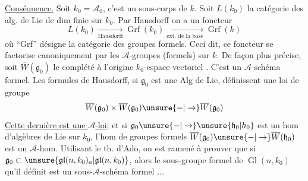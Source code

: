 \uline{Conséquence.} Soit $k_0=\mathcal A_0$, c'est un sous-corps de $k$. Soit $L(k_0)$ la catégorie des alg. de Lie de dim finie sur $k_0$. Par Hausdorff on a un foncteur
\[
L(k_0)\xrightarrow[\text{Hausdorff}]{}\operatorname{Grf}(k_0)\xrightarrow[\text{ext. de la base}]{}\operatorname{Grf}(k)
\]
où ``Grf'' désigne la catégorie des groupes formels.
Ceci dit, ce foncteur se factorise canoniquement par les $\mathcal A$-groupes (formels) sur $k$. De façon plus précise, soit $\overline W(\mathfrak g_0)$ le complété à l'origine  $k_0$-espace vectoriel . C'est un $\mathcal A$-schéma formel.
Les formules de Hausdorff, si $\mathfrak g_0$ est une Alg de Lie, définissent une loi de groupe
\[
\overline W(\mathfrak g_0)\times\overline W(\mathfrak g_0)\unsure{-|\to}\overline W(\mathfrak g_0)
\]
\uline{Cette dernière est une $\mathcal A$-loi};  et si
$\mathfrak g_0\unsure{-|\to}\unsure{\mathfrak h_0|h_0}$ est un hom d'algèbres de Lie sur $k_0$, l'hom de groupes formels $\overline W(\mathfrak g_0)\unsure{-|\to}\overline W(\mathfrak h_0)$ est un $\mathcal A$-hom.
Utilisant le th. d'Ado, on est ramené à prouver que si $\mathfrak g_0\subset\unsure{\mathfrak{gl}(n,k_0)_a|\mathfrak{gl}(n,k_0)}$, alors le sous-groupe formel de $\operatorname{Gl}(n,k_0)$ qu'il définit est un sous-$\mathcal A$-schéma formel $\ldots$
\margin{$-$}
